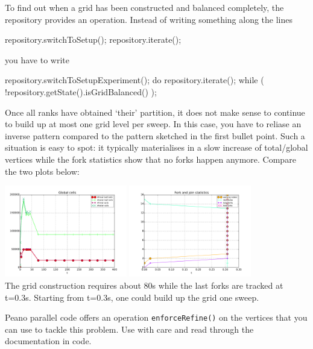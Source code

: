 To find out when a grid has been constructed and balanced completely, the
repository provides an operation. Instead of writing something along the lines

\begin{code}
  repository.switchToSetup();
  repository.iterate();
\end{code}

\noindent
you have to write
\begin{code}
  repository.switchToSetupExperiment();
  do {
    repository.iterate();
  } while ( !repository.getState().isGridBalanced() );
\end{code}




  \item Once all ranks have obtained `their' partition, it does not make sense
  to continue to build up at most one grid level per sweep. In this case, you
  have to reliase an inverse pattern compared to the pattern sketched in the
  first bullet point. Such a situation is easy to spot: it typically
  materialises in a slow increase of total/global vertices while the fork
  statistics show that no forks happen anymore. Compare the two plots below:
  \begin{center}
    \includegraphics[width=0.4\textwidth]{61_mpi-setup/grid-construction.pdf}
    \includegraphics[width=0.4\textwidth]{61_mpi-setup/fork-behaviour.pdf}
    \\
    {
    \footnotesize
    }
  The grid construction requires about 80s while the last forks are tracked
  at t=0.3s. Starting from t=0.3s, one could build up the grid one sweep.
  \end{center}
  \begin{remark}
    Peano parallel code offers an operation \texttt{enforceRefine()} on
    the vertices that you can use to tackle this problem. Use with care and 
    read through the documentation in code.
  \end{remark}


